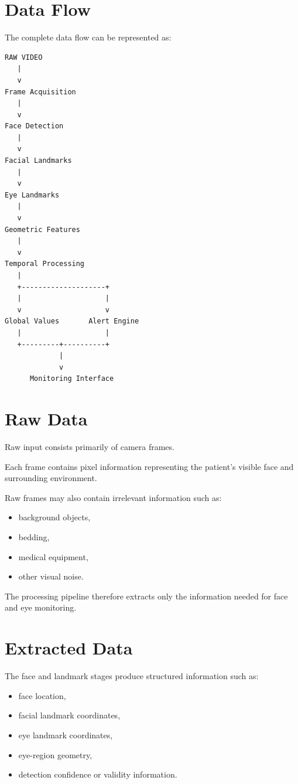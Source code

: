 \documentclass[12pt]{tietreport}
\begin{document}
\section{Data Flow}

The complete data flow can be represented as:

\begin{center}
\begin{verbatim}
RAW VIDEO
   |
   v
Frame Acquisition
   |
   v
Face Detection
   |
   v
Facial Landmarks
   |
   v
Eye Landmarks
   |
   v
Geometric Features
   |
   v
Temporal Processing
   |
   +--------------------+
   |                    |
   v                    v
Global Values       Alert Engine
   |                    |
   +---------+----------+
             |
             v
      Monitoring Interface
\end{verbatim}
\end{center}

\section{Raw Data}

Raw input consists primarily of camera frames.

Each frame contains pixel information representing the patient's
visible face and surrounding environment.

Raw frames may also contain irrelevant information such as:

\begin{itemize}[leftmargin=*]
    \item background objects,
    \item bedding,
    \item medical equipment,
    \item other visual noise.
\end{itemize}

The processing pipeline therefore extracts only the information
needed for face and eye monitoring.

\section{Extracted Data}

The face and landmark stages produce structured information such as:

\begin{itemize}[leftmargin=*]
    \item face location,
    \item facial landmark coordinates,
    \item eye landmark coordinates,
    \item eye-region geometry,
    \item detection confidence or validity information.
\end{itemize}
\end{document}
